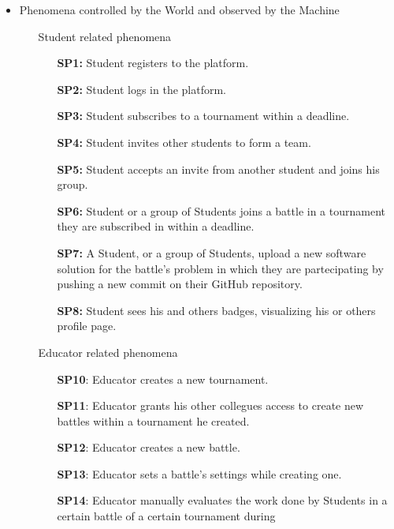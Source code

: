 \documentclass{article}
\newcounter{subsubsubsection}[subsubsection]
\begin{document}
\begin{itemize}
    \item Phenomena controlled by the World and observed by the Machine
          \begin{enumerate}
              \item[\ding{228}] Student related phenomena
                    \begin{enumerate}
                        \item[\textbf{SP1:}] Student registers to the platform.
                        \item[\textbf{SP2:}] Student logs in the platform.
                        \item[\textbf{SP3:}] Student subscribes to a tournament within a deadline.
                        \item[\textbf{SP4:}] Student invites other students to form a team.
                        \item[\textbf{SP5:}] Student accepts an invite from another student and joins his group.
                        \item[\textbf{SP6:}] Student or a group of Students joins a battle in a tournament they are subscribed in within a deadline.
                        \item[\textbf{SP7:}] A Student, or a group of Students, upload a new software solution for the battle's problem
                        in which they are partecipating by pushing a new commit on their GitHub repository. 
                        \item[\textbf{SP8:}] Student sees his and others badges, visualizing his or others profile page.
                    \end{enumerate}
              \item[\ding{228}] Educator related phenomena
                    \begin{enumerate}
                        \item[\textbf{SP10}:] Educator creates a new tournament.
                        \item[\textbf{SP11}:] Educator grants his other collegues access to create new battles within a tournament he created.
                        \item[\textbf{SP12}:] Educator creates a new battle.
                        \item[\textbf{SP13}:] Educator sets a battle's settings while creating one.
                        \item[\textbf{SP14}:] Educator manually evaluates the work done by Students in a certain battle of a certain tournament during

\end{enumerate}
\end{enumerate}
\end{itemize}
\end{document}
